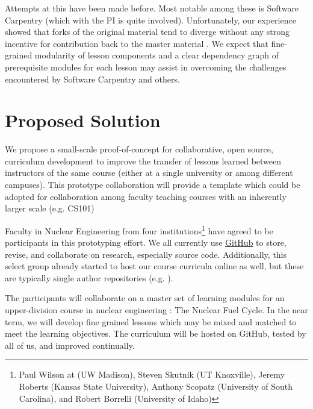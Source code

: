 \documentclass[11pt]{article}
\begin{document}
          Attempts at this have been made before. Most notable among 
          these is Software Carpentry (which with the PI is quite involved). 
          Unfortunately, our experience showed that 
          forks of the original material tend to diverge without any strong 
          incentive for contribution back to the master material 
          \cite{wilson_software_2014,wilson_software_2014-1}. We expect that fine-grained modularity 
          of lesson components and a clear dependency graph of prerequisite 
          modules for each lesson may assist in overcoming the challenges 
          encountered by Software Carpentry and others.

          \section{Proposed Solution}
          We propose a small-scale proof-of-concept for collaborative, open 
          source, curriculum development to improve the transfer of lessons 
          learned between instructors of the same course (either at a single 
          university or among different campuses). This prototype collaboration 
          will provide a template which could be adopted for collaboration 
          among faculty teaching courses with an inherently larger scale (e.g. 
          CS101)

          Faculty in Nuclear Engineering from four institutions\footnote{Paul 
          Wilson at (UW Madison), Steven Skutnik (UT Knoxville), Jeremy Roberts 
          (Kansas State University), Anthony Scopatz (University of South 
          Carolina), and Robert Borrelli (University of Idaho)} have agreed to be participants in 
          this prototyping effort. We all currently use 
          \href{https://github.com}{GitHub} to store, 
          revise, and collaborate on research, especially source code. 
          Additionally, this select group already started to host our course 
          curricula online as well, but these are typically single author 
          repositories (e.g. \cite{huff_npre412_2017}).

          The participants will collaborate on a master set of learning 
          modules for an upper-division course in nuclear engineering : 
          The Nuclear Fuel Cycle. In the near term, we will develop fine 
          grained lessons which may be mixed and matched to meet the 
          learning objectives. The curriculum will be hosted on GitHub, 
          tested by all of us, and improved continually.
\end{document}
